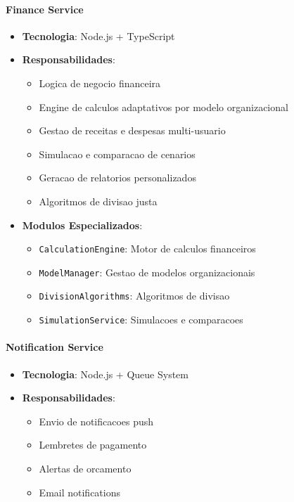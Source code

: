 \paragraph{Finance Service}
\begin{itemize}
    \item \textbf{Tecnologia}: Node.js + TypeScript
    \item \textbf{Responsabilidades}:
    \begin{itemize}
        \item Logica de negocio financeira
        \item Engine de calculos adaptativos por modelo organizacional
        \item Gestao de receitas e despesas multi-usuario
        \item Simulacao e comparacao de cenarios
        \item Geracao de relatorios personalizados
        \item Algoritmos de divisao justa
    \end{itemize}
    \item \textbf{Modulos Especializados}:
    \begin{itemize}
        \item \texttt{CalculationEngine}: Motor de calculos financeiros
        \item \texttt{ModelManager}: Gestao de modelos organizacionais
        \item \texttt{DivisionAlgorithms}: Algoritmos de divisao
        \item \texttt{SimulationService}: Simulacoes e comparacoes
    \end{itemize}
\end{itemize}

\paragraph{Notification Service}
\begin{itemize}
    \item \textbf{Tecnologia}: Node.js + Queue System
    \item \textbf{Responsabilidades}:
    \begin{itemize}
        \item Envio de notificacoes push
        \item Lembretes de pagamento
        \item Alertas de orcamento
        \item Email notifications
    \end{itemize}
\end{itemize}

